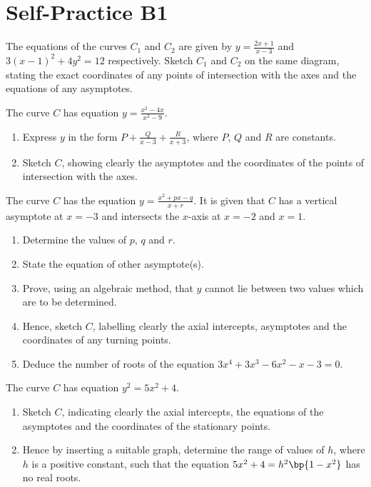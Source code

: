 \section{Self-Practice B1}

\begin{problem}
    The equations of the curves $C_{1}$ and $C_{2}$ are given by $y=\frac{2x+1}{x-3}$ and $3(x-1)^{2}+4y^{2}=12$ respectively. Sketch $C_{1}$ and $C_{2}$ on the same diagram, stating the exact coordinates of any points of intersection with the axes and the equations of any asymptotes.
\end{problem}

\begin{problem}
    The curve $C$ has equation $y=\frac{x^{2}-4x}{x^{2}-9}$.

    \begin{enumerate}
        \item Express $y$ in the form $P+\frac{Q}{x-3}+\frac{R}{x+3}$, where $P$, $Q$ and $R$ are constants.
        \item Sketch $C$, showing clearly the asymptotes and the coordinates of the points of intersection with the axes.
    \end{enumerate}
\end{problem}

\begin{problem}
    The curve $C$ has the equation $y=\frac{x^{2}+px-q}{x+r}$. It is given that $C$ has a vertical asymptote at $x=-3$ and intersects the $x$-axis at $x=-2$ and $x=1$.

    \begin{enumerate}
        \item Determine the values of $p$, $q$ and $r$.
        \item State the equation of other asymptote(s).
        \item Prove, using an algebraic method, that $y$ cannot lie between two values which are to be determined.
        \item Hence, sketch $C$, labelling clearly the axial intercepts, asymptotes and the coordinates of any turning points.
        \item Deduce the number of roots of the equation $3x^{4}+3x^{3}-6x^{2}-x-3=0$.
    \end{enumerate}
\end{problem}

\begin{problem}
    The curve $C$ has equation $y^{2}=5x^{2}+4$.

    \begin{enumerate}
        \item Sketch $C$, indicating clearly the axial intercepts, the equations of the asymptotes and the coordinates of the stationary points.
        \item Hence by inserting a suitable graph, determine the range of values of $h$, where $h$ is a positive constant, such that the equation $5x^{2}+4=h^{2}\bp{1-x^{2}}$ has no real roots.
    \end{enumerate}
\end{problem}

